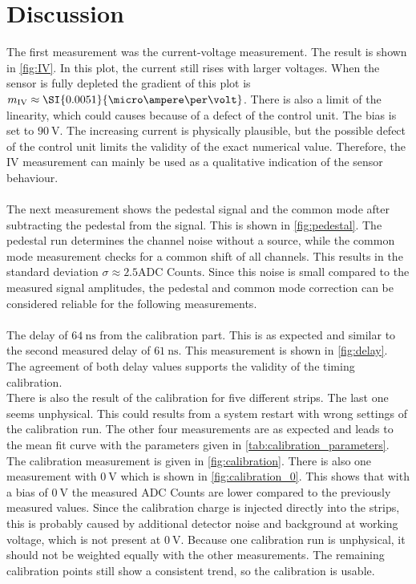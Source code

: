 \section{Discussion}
\label{sec:Discussion}
The first measurement was the current-voltage measurement. The result is shown in \autoref{fig:IV}. In this plot, the current still rises with larger voltages. When the sensor is fully depleted the gradient of this plot is $m_{\text{IV}} \approx \SI{0.0051}{{\micro\ampere}\per\volt}$. There is also a limit of the linearity, which could causes because of a defect of the control unit. The bias is set to  $\SI{90}{\volt}$. The increasing current is physically plausible, but the possible defect of the control unit limits the validity of the exact numerical value. Therefore, the IV measurement can mainly be used as a qualitative indication of the sensor behaviour.\\\\
The next measurement shows the pedestal signal and the common mode after subtracting the pedestal from the signal. This is shown in \autoref{fig:pedestal}. The pedestal run determines the channel noise without a source, while the common mode measurement checks for a common shift of all channels. This results in the standard deviation $\sigma \approx \num{2.5} \text{ADC Counts}$. Since this noise is small compared to the measured signal amplitudes, the pedestal and common mode correction can be considered reliable for the following measurements.\\\\
The delay of $\SI{64}{\nano\second}$ from the calibration part. This is as expected and similar to the second measured delay of $\SI{61}{\nano\second}$. This measurement is shown in \autoref{fig:delay}. The agreement of both delay values supports the validity of the timing calibration.\\
There is also the result of the calibration for five different strips. The last one seems unphysical. This could results from a system restart with wrong settings of the calibration run. The other four measurements are as expected and leads to the mean fit curve with the parameters given in \autoref{tab:calibration_parameters}. The calibration measurement is given in \autoref{fig:calibration}. There is also one measurement with $\SI{0}{\volt}$ which is shown in \autoref{fig:calibration_0}. This shows that with a bias of $\SI{0}{\volt}$ the measured ADC Counts are lower compared to the previously measured values. Since the calibration charge is injected directly into the strips, this is probably caused by additional detector noise and background at working voltage, which is not present at $\SI{0}{\volt}$. Because one calibration run is unphysical, it should not be weighted equally with the other measurements. The remaining calibration points still show a consistent trend, so the calibration is usable. \\\\
